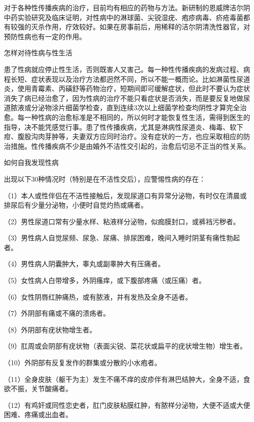 \documentclass[12pt,UTF8,openany]{ctexbook}
\begin{document}
对于各种性传播疾病的治疗，目前均有相应的药物与方法。新研制的恩威牌洁尔阴中药实验研究及临床证明，对性病中的淋球菌、尖锐湿疣、疱疹病毒、疥疮毒菌都有较强的灭杀作用，疗效较好。如果在房事前后，用稀释的洁尔阴清洗性器官，对预防性病也有一定的作用。





怎样对待性病与性生活


患了性病就应停止性生活，否则既害人又害己。每一种性传播疾病的发病过程、病程长短、症状表现以及治疗方法都迥然不同，所以不能一概而论。比如淋菌性尿道炎，使用青霉素、丙磺舒等药物治疗，短期间即可缓解症状，但此时不要认为症状消失了病已经治愈了，因为性病的治疗不能只看症状是否消失，而是要反复地做尿道脓液或分泌物涂片细菌学检查，直到连续3次以上细菌学检查均阴性才算完全治愈。每一种性病的治愈标准是不相同的，所以何时才能恢复性生活，需得到医生的指导，决不能凭感觉行事。患了性传播疾病，尤其是淋病性尿道炎、梅毒、软下疳、腹股沟肉芽肿等，夫妻双方应同时治疗。没有症状的一方，也应采取相应的防治措施。性传播疾病不少是由婚外不洁性交引起的，治愈后切忌不正当的性关系。





如何自我发现性病


出现以下30种情况时（特别是在不洁性交后），应警惕性病的存在：

（1）本人或性伴侣在不洁性接触后，发现尿道口有异常分泌物，有时仅在清晨或排尿后有少量分泌物，小便时自觉灼热或痛者。

（2）男性尿道口常有少量水样、粘液样分泌物，似痂膜封口，或裤裆污秽者。

（3）男性病人自觉尿频、尿急、尿痛、排尿困难，晚间入睡时阴茎有痛性勃起者。

（4）男性病人阴囊肿大，睾丸或副睾肿大有压痛者。

（5）女性病人白带增多，外阴瘙痒，或下腹部疼痛（或压痛）者。

（6）女性阴唇红肿痛热，或有脓液，并有发热及全身不适者。

（7）外阴部有痛或不痛的溃疡者。

（8）外阴部有疣状物增生者。

（9）肛周或会阴部有疣状物（表面尖锐、菜花状或扁平的疣状增生物）增生者。

（10）外阴部有反复发作的群集或分散的小水疱者。

（11）全身皮肤（躯干为主）发生不痛不痒的皮疹伴有淋巴结肿大，全身不适，食欲不振，关节酸痛者。

（12）有鸡奸或同性恋史者，肛门皮肤粘膜红肿，有脓样分泌物，大便不适或大便困难、疼痛或出血者。
\end{document}
